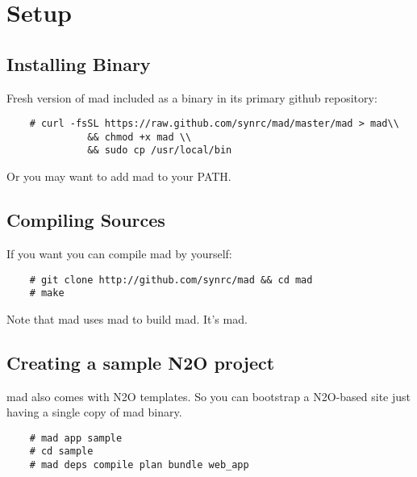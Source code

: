 \section{Setup}

\subsection{Installing Binary}

Fresh version of mad included as a binary in its primary github repository:

\vspace{1\baselineskip}
\begin{lstlisting}
    # curl -fsSL https://raw.github.com/synrc/mad/master/mad > mad\\
              && chmod +x mad \\
              && sudo cp /usr/local/bin
\end{lstlisting}
\vspace{1\baselineskip}

Or you may want to add mad to your PATH.

\subsection{Compiling Sources}

If you want you can compile mad by yourself:

\vspace{1\baselineskip}
\begin{lstlisting}
    # git clone http://github.com/synrc/mad && cd mad
    # make
\end{lstlisting}
\vspace{1\baselineskip}

Note that mad uses mad to build mad. It's mad.

\subsection{Creating a sample N2O project}

mad also comes with N2O templates. So you can bootstrap a N2O-based site
just having a single copy of mad binary.

\vspace{1\baselineskip}
\begin{lstlisting}
    # mad app sample
    # cd sample
    # mad deps compile plan bundle web_app
\end{lstlisting}
\vspace{1\baselineskip}

